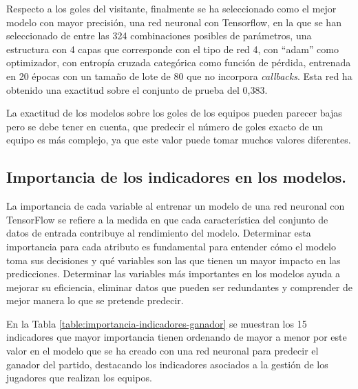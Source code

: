 Respecto a los goles del visitante, finalmente se ha seleccionado como el mejor modelo con mayor
precisión, una red neuronal con Tensorflow, en la que se han seleccionado de entre las 324
combinaciones posibles de parámetros, una estructura con 4 capas que corresponde con el tipo de red 4, con ``adam'' como optimizador,
con entropía cruzada categórica como función de pérdida, entrenada en 20 épocas con un tamaño
de lote de 80 que no incorpora \textit{callbacks}. Esta red ha obtenido una exactitud sobre el conjunto
de prueba del 0,383.

La exactitud de los modelos sobre los goles de los equipos pueden parecer bajas pero se debe
tener en cuenta, que predecir el número de goles exacto de un equipo es más complejo, ya que
este valor puede tomar muchos valores diferentes.



\subsection{Importancia de los indicadores en los modelos.}

La importancia de cada variable al entrenar un modelo de una red neuronal con TensorFlow se refiere a la medida en que cada característica del conjunto de datos de entrada contribuye al rendimiento del modelo. Determinar esta importancia para cada atributo es fundamental para entender cómo el modelo toma sus decisiones y qué variables son las que tienen un mayor impacto en las predicciones. Determinar las variables más importantes en los modelos ayuda a mejorar su eficiencia, eliminar datos que pueden ser redundantes y comprender de mejor manera lo que se pretende predecir.


En la Tabla \ref{table:importancia-indicadores-ganador} se muestran los 15 indicadores que mayor importancia tienen ordenando de mayor a menor por este valor en el modelo que se ha creado con una red neuronal para predecir el ganador del partido, destacando los indicadores asociados a la gestión de los jugadores que realizan los equipos.


